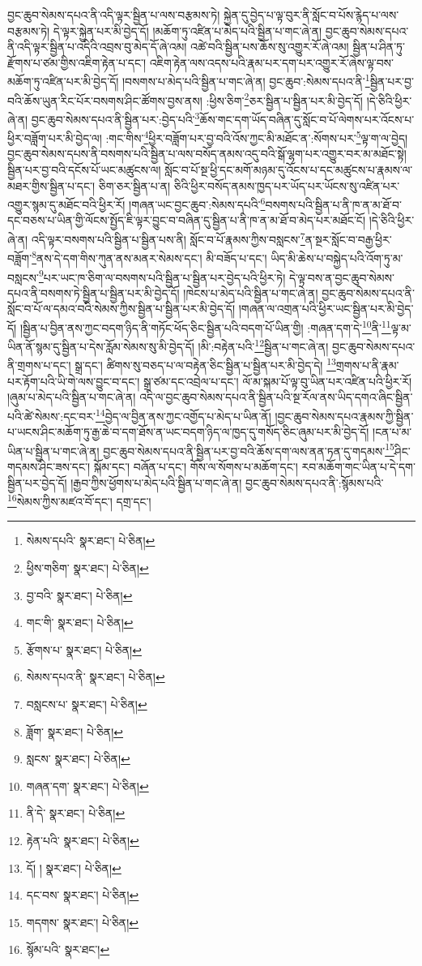 བྱང་ཆུབ་སེམས་དཔའ་ནི་འདི་ལྟར་སྦྱིན་པ་ལས་བརྩམས་ཏེ། སྐྱེན་དུ་བྱེད་པ་ལྟ་བུར་ནི་སློང་བ་པོས་རྙེད་པ་ལས་བརྩམས་ཏེ། དེ་ལྟར་སྐྱེན་པར་མི་བྱེད་དོ། །མཆོག་ཏུ་འཛིན་པ་མེད་པའི་སྦྱིན་པ་གང་ཞེ་ན། བྱང་ཆུབ་སེམས་དཔའ་ནི་འདི་ལྟར་སྦྱིན་པ་འདིའི་འབྲས་བུ་མེད་དོ་ཞེ་འམ། འཚེ་བའི་སྦྱིན་པས་ཆོས་སུ་འགྱུར་རོ་ཞེ་འམ། སྦྱིན་པ་ཤིན་ཏུ་རྫོགས་པ་ཙམ་གྱིས་འཇིག་རྟེན་པ་དང་། འཇིག་རྟེན་ལས་འདས་པའི་རྣམ་པར་དག་པར་འགྱུར་རོ་ཞེས་ལྟ་བས་མཆོག་ཏུ་འཛིན་པར་མི་བྱེད་དོ། །བསགས་པ་མེད་པའི་སྦྱིན་པ་གང་ཞེ་ན། བྱང་ཆུབ་:སེམས་དཔའ་ནི་\footnote{སེམས་དཔའི་  སྣར་ཐང་།  པེ་ཅིན། }སྦྱིན་པར་བྱ་བའི་ཆོས་ཡུན་རིང་པོར་བསགས་ཤིང་ཚོགས་བྱས་ནས། :ཕྱིས་ཅིག་\footnote{ཕྱིས་གཅིག་  སྣར་ཐང་།  པེ་ཅིན། }ཅར་སྦྱིན་པ་སྦྱིན་པར་མི་བྱེད་དོ། །དེ་ཅིའི་ཕྱིར་ཞེ་ན། བྱང་ཆུབ་སེམས་དཔའ་ནི་སྦྱིན་པར་:བྱེད་པའི་\footnote{བྱ་བའི་  སྣར་ཐང་།  པེ་ཅིན། }ཆོས་གང་དག་ཡོད་བཞིན་དུ་སློང་བ་པོ་ལེགས་པར་འོངས་པ་ཕྱིར་བཟློག་པར་མི་བྱེད་ལ། :གང་གིས་\footnote{གང་གི་  སྣར་ཐང་།  པེ་ཅིན། }ཕྱིར་བཟློག་པར་བྱ་བའི་འོས་ཀྱང་མི་མཐོང་ན་:སོགས་པར་\footnote{རྩོགས་པ་  སྣར་ཐང་།  པེ་ཅིན། }ལྟ་ག་ལ་བྱེད། བྱང་ཆུབ་སེམས་དཔས་ནི་བསགས་པའི་སྦྱིན་པ་ལས་བསོད་ནམས་འདུ་བའི་སྒོ་ལྷག་པར་འགྱུར་བར་མ་མཐོང་སྟེ། སྦྱིན་པར་བྱ་བའི་དངོས་པོ་ཡང་མཚུངས་ལ། སློང་བ་པོ་སྔ་ཕྱི་དང་མགོ་མཉམ་དུ་འོངས་པ་དང་མཚུངས་པ་རྣམས་ལ་མཐར་གྱིས་སྦྱིན་པ་དང་། ཅིག་ཅར་སྦྱིན་པ་ན། ཅིའི་ཕྱིར་བསོད་ནམས་ཁྱད་པར་ཡོད་པར་ཡོངས་སུ་འཛིན་པར་འགྱུར་སྙམ་དུ་མཐོང་བའི་ཕྱིར་རོ། །གཞན་ཡང་བྱང་ཆུབ་:སེམས་དཔའི་\footnote{སེམས་དཔའ་ནི་  སྣར་ཐང་།  པེ་ཅིན། }བསགས་པའི་སྦྱིན་པ་ནི་ཁ་ན་མ་ཐོ་བ་དང་བཅས་པ་ཡིན་གྱི་ལོངས་སྤྱོད་ཇི་ལྟར་བྱུང་བ་བཞིན་དུ་སྦྱིན་པ་ནི་ཁ་ན་མ་ཐོ་བ་མེད་པར་མཐོང་ངོ། །དེ་ཅིའི་ཕྱིར་ཞེ་ན། འདི་ལྟར་བསགས་པའི་སྦྱིན་པ་སྦྱིན་པས་ནི། སློང་བ་པོ་རྣམས་ཀྱིས་བསླངས་\footnote{བསླངས་པ་  སྣར་ཐང་།  པེ་ཅིན། }ན་སྔར་སློང་བ་བརྒྱ་ཕྱིར་བཟློག་\footnote{ཟློག་  སྣར་ཐང་།  པེ་ཅིན། }ནས་དེ་དག་གིས་ཀུན་ནས་མནར་སེམས་དང་། མི་བཟོད་པ་དང་། ཡིད་མི་ཆེས་པ་བསྐྱེད་པའི་འོག་ཏུ་མ་བསླངས་\footnote{སླངས་  སྣར་ཐང་།  པེ་ཅིན། }པར་ཡང་ཁ་ཅིག་ལ་བསགས་པའི་སྦྱིན་པ་སྦྱིན་པར་བྱེད་པའི་ཕྱིར་ཏེ། དེ་ལྟ་བས་ན་བྱང་ཆུབ་སེམས་དཔའ་ནི་བསགས་ཏེ་སྦྱིན་པ་སྦྱིན་པར་མི་བྱེད་དོ། །ཁེངས་པ་མེད་པའི་སྦྱིན་པ་གང་ཞེ་ན། བྱང་ཆུབ་སེམས་དཔའ་ནི་སློང་བ་པོ་ལ་དམའ་བའི་སེམས་ཀྱིས་སྦྱིན་པ་སྦྱིན་པར་མི་བྱེད་དོ། །གཞན་ལ་འགྲན་པའི་ཕྱིར་ཡང་སྦྱིན་པར་མི་བྱེད་དོ། །སྦྱིན་པ་བྱིན་ནས་ཀྱང་བདག་ཉིད་ནི་གཏོང་ཕོད་ཅིང་སྦྱིན་པའི་བདག་པོ་ཡིན་གྱི། :གཞན་དག་དེ་\footnote{གཞན་དག་  སྣར་ཐང་།  པེ་ཅིན། }ནི་\footnote{ནི་དེ་  སྣར་ཐང་།  པེ་ཅིན། }ལྟ་མ་ཡིན་ནོ་སྙམ་དུ་སྦྱིན་པ་དེས་རློམ་སེམས་སུ་མི་བྱེད་དོ། །མི་:བརྟེན་པའི་\footnote{རྟེན་པའི་  སྣར་ཐང་།  པེ་ཅིན། }སྦྱིན་པ་གང་ཞེ་ན། བྱང་ཆུབ་སེམས་དཔའ་ནི་གྲགས་པ་དང་། སྒྲ་དང་། ཚིགས་སུ་བཅད་པ་ལ་བརྟེན་ཅིང་སྦྱིན་པ་སྦྱིན་པར་མི་བྱེད་དེ། \footnote{དོ། །   སྣར་ཐང་།  པེ་ཅིན། }གྲགས་པ་ནི་རྣམ་པར་རྟོག་པའི་ཡི་གེ་ལས་བྱུང་བ་དང་། སྒྲ་ཙམ་དང་འབྲེལ་པ་དང་། ལོ་མ་སྐམ་པོ་ལྟ་བུ་ཡིན་པར་འཛིན་པའི་ཕྱིར་རོ། །ཞུམ་པ་མེད་པའི་སྦྱིན་པ་གང་ཞེ་ན། འདི་ལ་བྱང་ཆུབ་སེམས་དཔའ་ནི་སྦྱིན་པའི་སྔ་རོལ་ནས་ཡིད་དགའ་ཞིང་སྦྱིན་པའི་ཚེ་སེམས་:དང་བར་\footnote{དང་བས་  སྣར་ཐང་།  པེ་ཅིན། }བྱེད་ལ་བྱིན་ནས་ཀྱང་འགྱོད་པ་མེད་པ་ཡིན་ནོ། །བྱང་ཆུབ་སེམས་དཔའ་རྣམས་ཀྱི་སྦྱིན་པ་ཡངས་ཤིང་མཆོག་ཏུ་རྒྱ་ཆེ་བ་དག་ཐོས་ན་ཡང་བདག་ཉིད་ལ་ཁྱད་དུ་གསོད་ཅིང་ཞུམ་པར་མི་བྱེད་དོ། །ངན་པ་མ་ཡིན་པ་སྦྱིན་པ་གང་ཞེ་ན། བྱང་ཆུབ་སེམས་དཔའ་ནི་སྦྱིན་པར་བྱ་བའི་ཆོས་དག་ལས་ནན་ཏན་དུ་གདམས་\footnote{གདགས་  སྣར་ཐང་།  པེ་ཅིན། }ཤིང་གདམས་ཤིང་ཟས་དང་། སྐོམ་དང་། བཞོན་པ་དང་། གོས་ལ་སོགས་པ་མཆོག་དང་། རབ་མཆོག་གང་ཡིན་པ་དེ་དག་སྦྱིན་པར་བྱེད་དོ། །རྒྱབ་ཀྱིས་ཕྱོགས་པ་མེད་པའི་སྦྱིན་པ་གང་ཞེ་ན། བྱང་ཆུབ་སེམས་དཔའ་ནི་:སྙོམས་པའི་\footnote{སྙོམ་པའི་  སྣར་ཐང་། }སེམས་ཀྱིས་མཛའ་བོ་དང་། དགྲ་དང་། 